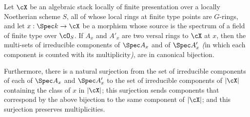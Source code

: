 \begin{alemma}
\label{lem:branches}
Let $\cX$ be an algebraic stack locally of finite presentation
over a locally Noetherian scheme $S$,
all of whose local rings at finite type points are $G$-rings,
and let $x: \Spec k \to \cX$ be a morphism whose source is the spectrum
of a field of finite type over $\cO_S$.
If $A_x$ and $A'_x$ are two versal rings to $\cX$ at $x$,
then the multi-sets of irreducible components of $\Spec A_x$
and of $\Spec A'_x$
{\em (}in which each component is counted with its multiplicity{\em )},
are in canonical bijection.

Furthermore, there is a natural surjection from the 
set of irreducible components of each of $\Spec A_x$ and $\Spec A'_x$
to the set of irreducible components of $|\cX|$ containing the
class of $x$ in $|\cX|$; this surjection sends components
that correspond by the above bijection to the same component
of $|\cX|$; and this surjection preserves multiplicities.
\end{alemma}
